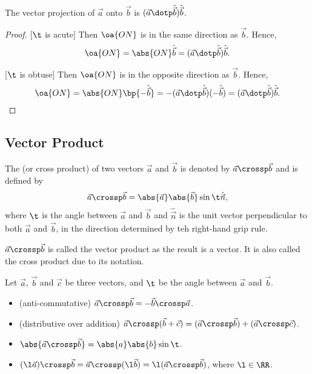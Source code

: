 \begin{proposition}
    The vector projection of $\vec a$ onto $\vec b$ is $(\vec a \dotp \hat{\vec b}) \hat{\vec b}$.
\end{proposition}
\begin{proof}
    [$\t$ is acute] Then $\oa{ON}$ is in the same direction as $\vec b$. Hence, \[\oa{ON} = \abs{ON} \hat{\vec b} = (\vec a \dotp \hat{\vec b}) \hat{\vec b}.\]

    [$\t$ is obtuse] Then $\oa{ON}$ is in the opposite direction as $\vec b$. Hence, \[\oa{ON} = \abs{ON} \bp{-\hat{\vec b}} = -(\vec a \dotp \hat{\vec b}) (-\hat{\vec b}) = (\vec a \dotp \hat{\vec b}) \hat{\vec b}.\]
\end{proof}

\subsection{Vector Product}

\begin{definition}
    The  (or cross product) of two vectors $\vec a$ and $\vec b$ is denoted by $\vec a \crossp \vec b$ and is defined by \[\vec a \crossp \vec b = \abs{\vec a}\abs{\vec b} \sin \t \hat{\vec n},\] where $\t$ is the angle between $\vec a$ and $\vec b$ and $\hat{\vec n}$ is the unit vector perpendicular to both $\vec a$ and $\vec b$, in the direction determined by teh right-hand grip rule.
\end{definition}
\begin{remark}
    $\vec a \crossp \vec b$ is called the vector product as the result is a vector. It is also called the cross product due to its notation.
\end{remark}

\begin{fact}
    Let $\vec a$, $\vec b$ and $\vec c$ be three vectors, and $\t$ be the angle between $\vec a$ and $\vec b$.
    \begin{itemize}
        \item (anti-commutative) $\vec a \crossp \vec b = -\vec b \crossp \vec a$.
        \item (distributive over addition) $\vec a \crossp (\vec b + \vec c) = (\vec a \crossp \vec b) + (\vec a \crossp \vec c)$.
        \item $\abs{\vec a \crossp \vec b} = \abs{a} \abs{b} \sin \t$.
        \item $(\l \vec a) \crossp \vec b = \vec a \crossp (\l \vec b) = \l (\vec a \crossp \vec b)$, where $\l \in \RR$.
    \end{itemize}
\end{fact}

